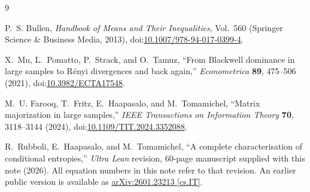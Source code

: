 \documentclass[11pt]{article}
\theoremstyle{definition}
\begin{document}
\begin{thebibliography}{9}

P.~S. Bullen,
\emph{Handbook of Means and Their Inequalities}, Vol.~560
(Springer Science \& Business Media, 2013),
doi:\href{https://doi.org/10.1007/978-94-017-0399-4}{10.1007/978-94-017-0399-4}.

X.~Mu, L.~Pomatto, P.~Strack, and O.~Tamuz,
``From Blackwell dominance in large samples to R\'enyi divergences and back again,''
\emph{Econometrica} \textbf{89}, 475--506 (2021),
doi:\href{https://doi.org/10.3982/ECTA17548}{10.3982/ECTA17548}.

M.~U. Farooq, T.~Fritz, E.~Haapasalo, and M.~Tomamichel,
``Matrix majorization in large samples,''
\emph{IEEE Transactions on Information Theory} \textbf{70}, 3118--3144 (2024),
doi:\href{https://doi.org/10.1109/TIT.2024.3352088}{10.1109/TIT.2024.3352088}.

R.~Rubboli, E.~Haapasalo, and M.~Tomamichel,
``A complete characterisation of conditional entropies,''
\emph{Ultra Lean} revision, 60-page manuscript supplied with this note (2026).
All equation numbers in this note refer to that revision.  An earlier public
version is available as
\href{https://arxiv.org/abs/2601.23213}{arXiv:2601.23213 [cs.IT]}.

\end{thebibliography}
\end{document}
